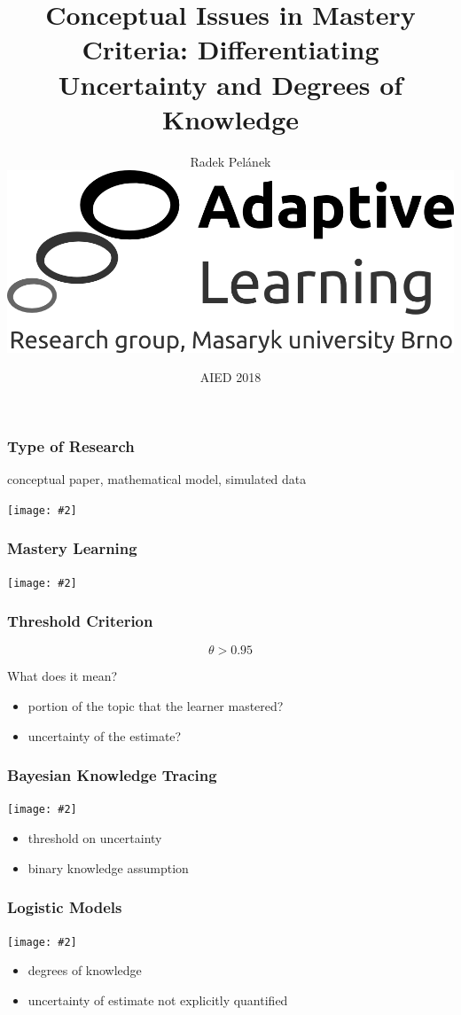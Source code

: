 \documentclass[bigger]{beamer}
\title{Conceptual Issues in Mastery Criteria: Differentiating Uncertainty and
  Degrees of Knowledge}
\author{Radek Pel\'anek\\[10mm]
\includegraphics[width=.3\linewidth]{al-logo}
}
\date{AIED 2018}
\newcommand{\img}[2]{
  \begin{center}
    \texttt{[image: \#2]}
  \end{center}
}
\begin{document}
\frame{\titlepage}

\begin{frame}
  \frametitle{Type of Research}

  \begin{center}
    conceptual paper, mathematical model, simulated data
  \end{center}
  
  \bigskip

  \img{.7}{umime-prehled}
\end{frame}

\begin{frame}
  \frametitle{Mastery Learning}

  \img{1}{mastery-learning}
\end{frame}

\begin{frame}
  \frametitle{Threshold Criterion}

  \[ \theta > 0.95 \]

  \begin{center}
    What does it mean?
  \end{center}

  \pause
  \bigskip

  \begin{itemize}
  \item portion of the topic that the learner mastered?
  \item uncertainty of the estimate?
  \end{itemize}
\end{frame}

\begin{frame}
  \frametitle{Bayesian Knowledge Tracing}

  \img{.5}{bkt}

  \begin{itemize}
  \item threshold on uncertainty
  \item binary knowledge assumption
  \end{itemize}
\end{frame}

\begin{frame}
  \frametitle{Logistic Models}

  \img{.5}{logistic}

  \begin{itemize}
  \item degrees of knowledge
  \item uncertainty of estimate not explicitly quantified
  \end{itemize}
\end{frame}
\end{document}
